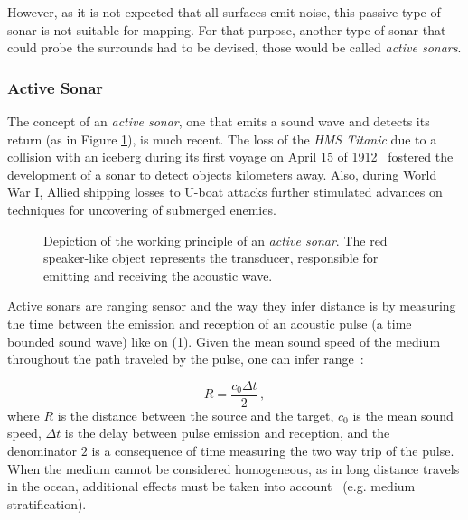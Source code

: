 However, as it is not expected that all surfaces emit noise, this passive type
of sonar is not suitable for mapping.
For that purpose, another type of sonar that could probe the surrounds had to be
devised, those would be called \textit{active sonars}.


\subsubsection{Active Sonar}

The concept of an \textit{active sonar}, one that emits a sound wave and detects
its return (as in Figure \ref{fig:sonar_principle}), is much recent. The
loss of the \textit{HMS Titanic} due to a collision with an iceberg during its
first voyage on April 15 of 1912~\cite{histsonar} fostered the development of a sonar
to detect objects kilometers away. Also, during World War I,
Allied shipping losses to U-boat attacks further stimulated advances on
techniques for uncovering of submerged enemies.

\begin{figure}
	\centering
	
	\caption{Depiction of the working principle of an \textit{active sonar}. The
	red speaker-like object represents the transducer, responsible for
	emitting and receiving the acoustic wave.}
	\label{fig:sonar_principle}
\end{figure}

Active sonars are ranging sensor and the way they infer distance is by measuring
the time between the emission and reception of an acoustic pulse (a time bounded
sound wave) like on (\ref{fig:sonar_principle}). Given the mean sound speed of
the medium throughout the path traveled by the pulse, one can infer range~\cite{LURTON}:

\begin{equation}
R = \frac{c_0 \Delta t}{2}\,,
\label{eq:delaytodistance}
\end{equation}
%
where $R$ is the distance between the source and the target, $c_0$ is the mean
sound speed, $\Delta t$ is the delay between pulse emission and reception, and
the denominator $2$ is a consequence of time measuring the two way
trip of the pulse. When the medium cannot be considered homogeneous, as in long distance travels in
the ocean, additional effects must be taken into account~\cite{Etter2013} (e.g.
medium stratification).


